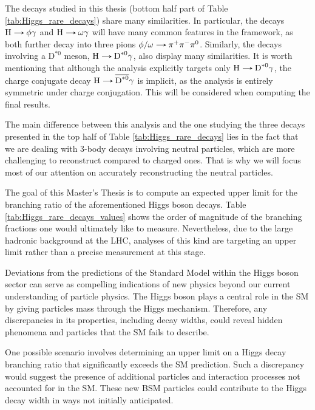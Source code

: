 The decays studied in this thesis (bottom half part of Table \ref{tab:Higgs_rare_decays}) share many similarities. In particular, the decays $\text{H}\decaysto \phi\gamma$ and $\text{H}\decaysto \omega\gamma$ will have many common features in the framework, as both further decay into three pions $\phi/\omega\decaysto \pi^+\pi^-\pi^0$. Similarly, the decays involving a $\text{D}^{*0}$ meson, $\text{H}\decaysto \text{D}^{*0}\gamma$, also display many similarities. It is worth mentioning that although the analysis explicitly targets only $\text{H}\decaysto \text{D}^{*0}\gamma$, the charge conjugate decay $\text{H}\decaysto \overline{\text{D}^{*0}}\gamma$ is implicit, as the analysis is entirely symmetric under charge conjugation. This will be considered when computing the final results.

The main difference between this analysis and the one studying the three decays presented in the top half of Table \ref{tab:Higgs_rare_decays} lies in the fact that we are dealing with 3-body decays involving neutral particles, which are more challenging to reconstruct compared to charged ones. That is why we will focus most of our attention on accurately reconstructing the neutral particles.

The goal of this Master's Thesis is to compute an expected upper limit for the branching ratio of the aforementioned Higgs boson decays. Table \ref{tab:Higgs_rare_decays_values} shows the order of magnitude of the branching fractions one would ultimately like to measure. Nevertheless, due to the large hadronic background at the LHC, analyses of this kind are targeting an upper limit rather than a precise measurement at this stage.

Deviations from the predictions of the Standard Model within the Higgs boson sector can serve as compelling indications of new physics beyond our current understanding of particle physics. The Higgs boson plays a central role in the SM by giving particles mass through the Higgs mechanism. Therefore, any discrepancies in its properties, including decay widths, could reveal hidden phenomena and particles that the SM fails to describe.

One possible scenario involves determining an upper limit on a Higgs decay branching ratio that significantly exceeds the SM prediction. Such a discrepancy would suggest the presence of additional particles and interaction processes not accounted for in the SM. These new BSM particles could contribute to the Higgs decay width in ways not initially anticipated.

